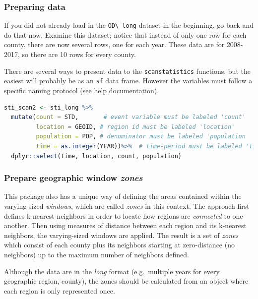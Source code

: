 \documentclass[
]{book}
\newcommand{\passthrough}[1]{#1}
\begin{document}
\hypertarget{preparing-data}{%
\subsubsection{Preparing data}\label{preparing-data}}

If you did not already load in the \passthrough{\lstinline!OD\_long!} dataset in the beginning, go back and do that now. Examine this dataset; notice that instead of only one row for each county, there are now several rows, one for each year. These data are for 2008-2017, so there are 10 rows for every county.

There are several ways to present data to the \passthrough{\lstinline!scanstatistics!} functions, but the easiest will probably be as an \passthrough{\lstinline!sf!} data frame. However the variables must follow a specific naming protocol (see help documentation).

\begin{lstlisting}[language=R]
sti_scan2 <- sti_long %>%
  mutate(count = STD,       # event variable must be labeled 'count'
         location = GEOID, # region id must be labeled 'location'
         population = POP, # denominator must be labeled 'population
         time = as.integer(YEAR))%>%  # time-period must be labeled 'time'
  dplyr::select(time, location, count, population) 
\end{lstlisting}

\hypertarget{prepare-geographic-window-zones}{%
\subsubsection{\texorpdfstring{Prepare geographic window \emph{zones}}{Prepare geographic window zones}}\label{prepare-geographic-window-zones}}

This package also has a unique way of defining the areas contained within the varying-sized \emph{windows}, which are called \emph{zones} in this context. The approach first defines k-nearest neighbors in order to locate how regions are \emph{connected} to one another. Then using measures of distance between each region and its k-nearest neighbors, the varying-sized windows are applied. The result is a set of \emph{zones} which consist of each county plus its neighbors starting at zero-distance (no neighbors) up to the maximum number of neighbors defined.

Although the data are in the \emph{long} format (e.g.~multiple years for every geographic region, county), the zones should be calculated from an object where each region is only represented once.
\end{document}
